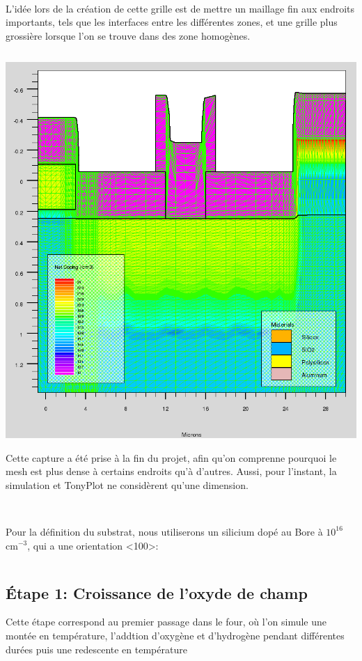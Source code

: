 \documentclass{article}
\begin{document}
~

L’idée lors de la création de cette grille est de mettre un maillage fin aux endroits importants, tels que les interfaces entre les différentes zones, et une grille plus grossière lorsque l’on se trouve dans des zone homogènes.

\inputminted[linenos,lastline=17]{sh}{final_named.in}

\includegraphics[width=\linewidth]{mesh.png}

Cette capture a été prise à la fin du projet, afin qu’on comprenne pourquoi le mesh est plus dense à certains endroits qu’à d’autres. Aussi, pour l’instant, la simulation et TonyPlot ne considèrent qu’une dimension.

~

Pour la définition du substrat, nous utiliserons un silicium dopé au Bore à $10^{16}$ cm$^{-3}$, qui a une orientation <100>:
\inputminted[linenos,firstnumber=18,firstline=18,lastline=19]{sh}{final_named.in}

\subsection{Étape 1: Croissance de l’oxyde de champ}
Cette étape correspond au premier passage dans le four, où l’on simule une montée en température, l’addtion d’oxygène et d’hydrogène pendant différentes durées puis une redescente en température
\end{document}
